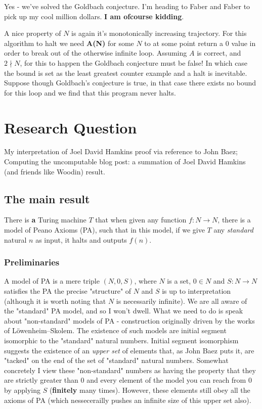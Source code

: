 \documentclass{article}
\begin{document}
Yes - we've solved the Goldbach conjecture. I'm heading to Faber and Faber to pick up my cool million dollars. \textbf{I am ofcourse kidding}. 

A nice property of $N$ is again it's monotonically increasing trajectory. For this algorithm to halt we need \textbf{A(N)} for some $N$ to at some point return a $0$ value in order to break out of the otherwise infinite loop. Assuming $A$ is correct, and $2 \nmid N$, for this to happen the Goldbach conjecture must be false! In which case the bound is set as the least greatest counter example and a halt is inevitable. Suppose though Goldbach's conjecture is true, in that case there exists no bound for this loop and we find that this program never halts.

\pagebreak
\section{Research Question}
My interpretation of Joel David Hamkins proof via reference to John Baez; Computing the uncomputable blog post: a summation of Joel David Hamkins (and friends like Woodin) result.

\subsection{The main result}
There is \textbf{a} Turing machine $T$ that when given any function $f: N \rightarrow N$, there is a model of Peano Axioms (PA), such that in this model, if we give $T$ any \emph{standard} natural $n$ as input, it halts and outputs $f(n)$.

\subsubsection{Preliminaries}
A model of PA is a mere triple $(N, 0, S)$, where $N$ is a set, $0 \in N$ and $S: N \rightarrow N$ satisfies the PA the precise "structure" of $N$ and $S$ is up to interpretation (although it is worth noting that $N$ is necessarily infinite). We are all aware of the "standard" PA model, and so I won't dwell. What we need to do is speak about "non-standard" models of PA - construction originally driven by the works of Löwenheim–Skolem. The existence of such models are initial segment isomorphic to the "standard" natural numbers. Initial segment isomorphism suggests the existence of an \emph{upper set} of elements that, as John Baez puts it, are "tacked" on the end of the set of "standard" natural numbers. Somewhat concretely I view these "non-standard" numbers as having the property that they are strictly greater than $0$ and every element of the model you can reach from 0 by applying $S$ (\textbf{finitely} many times). However, these elements still obey all the axioms of PA (which nessecerailly pushes an infinite size of this upper set also).
\end{document}
